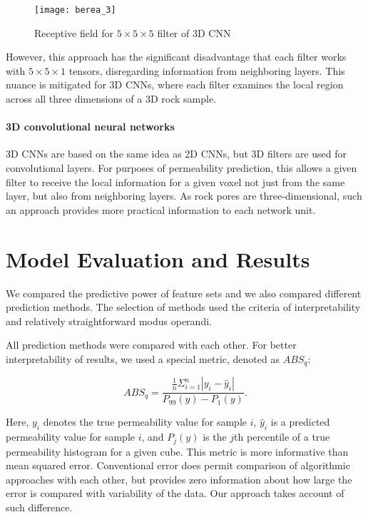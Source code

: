 \documentclass[review]{elsarticle}
\begin{document}
\begin{wrapfigure}{l}{0.5\textwidth}
    \centering
    \texttt{[image: berea\_3]}
    \caption{Receptive field for $5 \times 5 \times 5$ filter of 3D CNN}
\end{wrapfigure}

However, this approach has the significant disadvantage that each filter works with $5 \times 5 \times 1$ tensors, disregarding information from neighboring layers. This nuance is mitigated for 3D CNNs, where each filter examines the local region across all three dimensions of a 3D rock sample.

\paragraph{3D convolutional neural networks}

3D CNNs are based on the same idea as 2D CNNs, but 3D filters are used for convolutional layers. For purposes of permeability prediction, this allows a given filter to receive the local information for a given voxel not just from the same layer, but also from neighboring layers. As rock pores are three-dimensional, such an approach provides more practical information to each network unit.

\section{Model Evaluation and Results}

We compared the predictive power of feature sets and we also compared different prediction methods. The selection of methods used the criteria of interpretability and relatively straightforward modus operandi.

 	All prediction methods were compared with each other. For better interpretability of results, we used a special metric, denoted as $ABS_q:$

$$ABS_q = \frac{\frac{1}{n}\Sigma_{i=1}^n |y_i - \hat{y}_i|}{P_{99}(y)-P_{1}(y)}. $$

Here, $y_i$ denotes the true permeability value for sample $i$, $\hat{y}_i$ is a predicted permeability value for sample $i$, and $P_j(y)$ is the $j$th percentile of a true permeability histogram for a given cube. This metric is more informative than mean squared error. Conventional error does permit comparison of algorithmic approaches with each other, but provides zero information about how large the error is compared with variability of the data. Our approach takes account of such difference.
\end{document}

